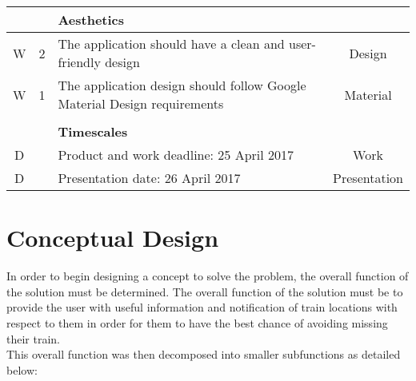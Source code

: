 \documentclass[paper=a4, fontsize=12pt]{scrartcl} %
\numberwithin{equation}{section} %
\numberwithin{figure}{section} %
\numberwithin{table}{section} %
\begin{document}
\begin{center}
\begin{tabular}{|| c | c || p{12cm} || c ||}
            && \textbf{Aesthetics} & \\
            \hline
            W & 2 & The application should have a clean and user-friendly design & Design \\
            W & 1 & The application design should follow Google Material Design requirements & Material \\
            &&& \\

            && \textbf{Timescales} & \\
            \hline
            D && Product and work deadline: 25 April 2017 & Work \\
            D && Presentation date: 26 April 2017 & Presentation \\
            \hline

        \end{tabular}
        \end{center}

    \section{Conceptual Design}

        In order to begin designing a concept to solve the problem, the overall function of the solution must be determined. The overall function of the solution must be to provide the user with useful information and notification of train locations with respect to them in order for them to have the best chance of avoiding missing their train.\\

        This overall function was then decomposed into smaller subfunctions as detailed below:\\
\end{document}
